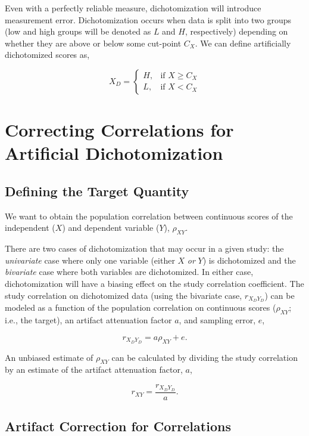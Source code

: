 \documentclass[
  letterpaper,
  DIV=11,
  numbers=noendperiod]{scrreprt}
\begin{document}
Even with a perfectly reliable measure, dichotomization will introduce
measurement error. Dichotomization occurs when data is split into two
groups (low and high groups will be denoted as \(L\) and \(H\),
respectively) depending on whether they are above or below some
cut-point \(C_X\). We can define artificially dichotomized scores as,

\[
X_D= 
\begin{cases}
    H,& \text{if } X\geq C_X\\
    L,& \text{if } X<C_X
\end{cases}
\]

\section{Correcting Correlations for Artificial
Dichotomization}\label{correcting-correlations-for-artificial-dichotomization}

\subsection{Defining the Target
Quantity}\label{defining-the-target-quantity-3}

We want to obtain the population correlation between continuous scores
of the independent (\(X\)) and dependent variable (\(Y\)),
\(\rho_{XY}\).

There are two cases of dichotomization that may occur in a given study:
the \emph{univariate} case where only one variable (either \(X\)
\emph{or} \(Y\)) is dichotomized and the \emph{bivariate} case where
both variables are dichotomized. In either case, dichotomization will
have a biasing effect on the study correlation coefficient. The study
correlation on dichotomized data (using the bivariate case,
\(r_{X_D Y_D}\)) can be modeled as a function of the population
correlation on continuous scores (\(\rho_{XY}\); i.e., the target), an
artifact attenuation factor \(a\), and sampling error, \(e\),

\[
r_{X_DY_D} = a\rho_{XY}+e.
\]

An unbiased estimate of \(\rho_{XY}\) can be calculated by dividing the
study correlation by an estimate of the artifact attenuation factor,
\(a\),

\[
r_{XY} = \frac{r_{X_D Y_D}}{a}.
\]

\subsection{Artifact Correction for
Correlations}\label{sec-corr-artifacts}
\end{document}
